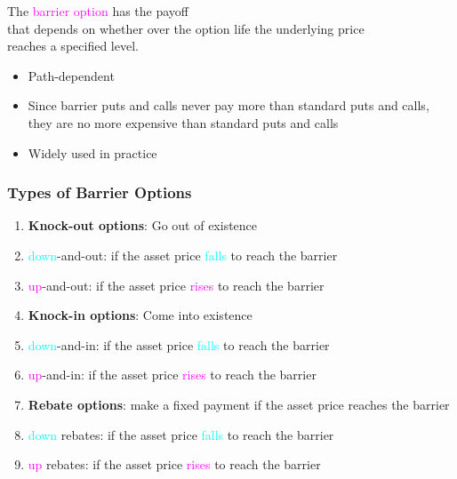 \def\mySecNum{14.3}
\mySection{\mySecNum~Barrier options}
\begin{frame}[fragile,t]
	\begin{center}
		The \textcolor{magenta}{barrier option} has the payoff            \\
		that depends on whether over the option life the underlying price \\
		reaches a specified level.
	\end{center}
	\vfill
	\pause
	\begin{itemize}
		\item Path-dependent
			\bigskip
		\item Since barrier puts and calls never pay more than standard puts and calls, they are no more expensive than standard puts and calls
			\bigskip
		\item Widely used in practice
	\end{itemize}
\end{frame}
\begin{frame}[fragile,t]
	\frametitle{Types of Barrier Options}
\begin{enumerate}
	\item {\bf Knock-out options}: Go out of existence
	\item[] \textcolor{cyan}{down}-and-out: if the asset price \textcolor{cyan}{falls} to reach the barrier
	\item[] \textcolor{magenta}{up}-and-out: if the asset price \textcolor{magenta}{rises} to reach the barrier
		\bigskip

	\item {\bf Knock-in options}: Come into existence
	\item[] \textcolor{cyan}{down}-and-in: if the asset price \textcolor{cyan}{falls} to reach the barrier
	\item[] \textcolor{magenta}{up}-and-in: if the asset price \textcolor{magenta}{rises} to reach the barrier
		\bigskip

	\item {\bf Rebate options}: make a fixed payment if the asset price reaches the barrier
	\item[] \textcolor{cyan}{down} rebates: if the asset price \textcolor{cyan}{falls} to reach the barrier
	\item[] \textcolor{magenta}{up} rebates: if the asset price \textcolor{magenta}{rises} to reach the barrier
\end{enumerate}
\end{frame}
